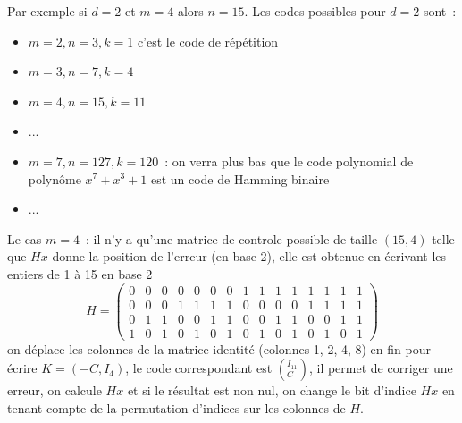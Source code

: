 \documentclass[a4paper,11pt]{book}
\begin{document}
\begin{giacjshere}
Par exemple si $d=2$ et $m=4$ alors $n=15$. 
Les codes possibles pour $d=2$ sont~:
\begin{itemize}
\item $m=2, n=3, k=1$ c'est le code de r\'ep\'etition
\item $m=3,n=7,k=4$ 
\item $m=4,n=15,k=11$
\item ...
\item $m=7, n=127,k=120$~: 
on verra plus bas que le code polynomial de polyn\^ome
$x^7+x^3+1$ est un code de Hamming binaire
\item ...
\end{itemize}
Le cas $m=4$~: il n'y a qu'une matrice de controle possible de taille
$(15,4)$ telle que $Hx$ donne la position de l'erreur (en base 2),
elle est obtenue en \'ecrivant les entiers de 1 \`a 15 en base 2
$$ H=\left( \begin{array}{ccccccccccccccc}
0 & 0 & 0 & 0 & 0 & 0 & 0 & 1 & 1 & 1 & 1 & 1 & 1 & 1 & 1 \\
0 & 0 & 0 & 1 & 1 & 1 & 1 & 0 & 0 & 0 & 0 & 1 & 1 & 1 & 1 \\
0 & 1 & 1 & 0 & 0 & 1 & 1 & 0 & 0 & 1 & 1 & 0 & 0 & 1 & 1 \\
1 & 0 & 1 & 0 & 1 & 0 & 1 & 0 & 1 & 0 & 1 & 0 & 1 & 0 & 1
 \end{array} \right)$$
on d\'eplace les colonnes de la matrice identit\'e 
(colonnes 1, 2, 4, 8)
en fin pour \'ecrire $K=(-C,I_4)$, le code correspondant est
$\left( ^{I_{11}} _C \right)$, il permet de corriger une erreur,
on calcule $Hx$ et si le r\'esultat est non nul, on change le
bit d'indice $Hx$ en tenant compte de la permutation d'indices
sur les colonnes de $H$.


\end{giacjshere}
\end{document}
